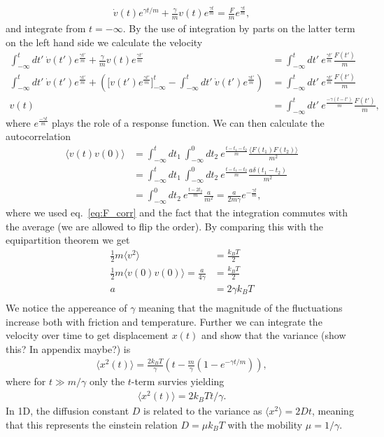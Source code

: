 \begin{align*}
  \dot{ v}(t)e^{\gamma t /m} + \frac{\gamma}{m} v(t)e^{\frac{\gamma t}{m}}  = \frac{ F}{m}e^{\frac{\gamma t}{m}},
\end{align*}
and integrate from $t = -\infty$. By the use of integration by parts on the
latter term on the left hand side we calculate the velocity 
\begin{align*}
  \int_{-\infty}^t dt' \ \dot{ v}(t')e^{\frac{\gamma t'}{m}} + \frac{\gamma}{m} v(t)e^{\frac{\gamma t'}{m}} &=  \int_{-\infty}^t dt' \ e^{\frac{\gamma t'}{m}} \frac{ F(t')}{m}  \\
  \int_{-\infty}^t dt' \ \dot{ v}(t')e^{\frac{\gamma t'}{m}} + \left(\Big[ v(t')e^{\frac{\gamma t'}{m}}\Big]_{-\infty}^t - \int_{-\infty}^t dt' \ \dot{ v}(t')e^{\frac{\gamma t'}{m}}\right) &= \int_{-\infty}^t dt' \ e^{\frac{\gamma t'}{m}} \frac{ F(t')}{m}  \\
   v(t) &= \int_{-\infty}^t dt' \ e^{\frac{-\gamma(t - t')}{m}} \frac{ F(t')}{m},
\end{align*}
where $e^{\frac{-\gamma t}{m}}$ plays the role of a response function. We can
then calculate the autocorrelation 
\begin{align*}
  \big\langle  v(t) v(0) \big\rangle &= \int_{-\infty}^t dt_1 \ \int_{-\infty}^0 dt_2 \ e^{\frac{t - t_1 - t_2}{m}} \frac{\langle  F(t_1)  F(t_2) \rangle}{m^2} \\
  &= \int_{-\infty}^t dt_1 \ \int_{-\infty}^0 dt_2 \ e^{\frac{t - t_1 - t_2}{m}} \frac{a \delta(t_1 - t_2)}{m^2} \\
  &= \int_{-\infty}^0 dt_2 \ e^{\frac{t - 2t_2}{m}} \frac{a}{m^2} = \frac{a}{2m\gamma}e^{-\frac{\gamma t}{m}},
\end{align*}
where we used eq.~\eqref{eq:F_corr} and the fact that the integration commutes
with the average (we are allowed to flip the order). By comparing this with the
equipartition theorem we get 
\begin{align*}
  \frac{1}{2}m\langle  v^2 \rangle &= \frac{k_BT}{2} \\
  \frac{1}{2}m\langle  v(0) v(0) \rangle = \frac{a}{4\gamma} &= \frac{k_BT}{2} \\
  a &=  2\gamma k_B T \\
\end{align*}
We notice the appereance of $\gamma$ meaning that the magnitude of the
fluctuations increase both with friction and temperature. Further we can
integrate the velocity over time to get displacement $x(t)$ and show that the
variance (show this? In appendix maybe?) is 
\begin{align*}
  \big\langle x^2(t) \big\rangle = \frac{2 k_B T}{\gamma} \left(t - \frac{m}{\gamma}\left(1 - e^{-\gamma t/m} \right) \right),
\end{align*}
where for $t \gg m/\gamma$ only the $t$-term survies yielding
\begin{align*}
  \langle x^2(t) \rangle = 2 k_BTt/\gamma.
\end{align*}
In 1D, the diffusion constant $D$ is related to the variance as $\langle x^2
\rangle = 2Dt$, meaning that this represents the einstein relation $D = \mu k_B
T$ with the mobility $\mu = 1/\gamma$.

